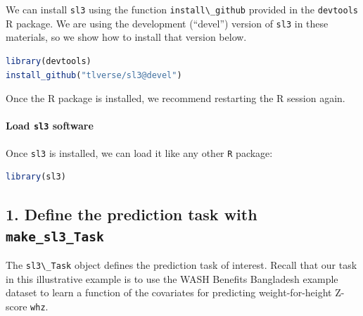 \documentclass[
  12pt, krantz2,
]{krantz}
\newcommand{\passthrough}[1]{#1}
\newcommand{\1}{\mathbbm{1}}
\theoremstyle{definition}
\theoremstyle{definition}
\theoremstyle{definition}
\theoremstyle{definition}
\theoremstyle{remark}
\begin{document}
We can install \passthrough{\lstinline!sl3!} using the function \passthrough{\lstinline!install\_github!} provided in the
\passthrough{\lstinline!devtools!} R package. We are using the development (``devel'') version of \passthrough{\lstinline!sl3!}
in these materials, so we show how to install that version below.

\begin{lstlisting}[language=R]
library(devtools)
install_github("tlverse/sl3@devel")
\end{lstlisting}

Once the R package is installed, we recommend restarting the R session again.

\hypertarget{load-sl3-software}{%
\paragraph*{\texorpdfstring{Load \texttt{sl3} software}{Load sl3 software}}\label{load-sl3-software}}

Once \passthrough{\lstinline!sl3!} is installed, we can load it like any other \passthrough{\lstinline!R!} package:

\begin{lstlisting}[language=R]
library(sl3)
\end{lstlisting}

\hypertarget{define-the-prediction-task-with-make_sl3_task}{%
\subsection*{\texorpdfstring{1. Define the prediction task with \texttt{make\_sl3\_Task}}{1. Define the prediction task with make\_sl3\_Task}}\label{define-the-prediction-task-with-make_sl3_task}}


The \passthrough{\lstinline!sl3\_Task!} object defines the prediction task of interest. Recall that
our task in this illustrative example is to use the WASH Benefits Bangladesh
example dataset to learn a function of the covariates for predicting
weight-for-height Z-score \passthrough{\lstinline!whz!}.
\end{document}

